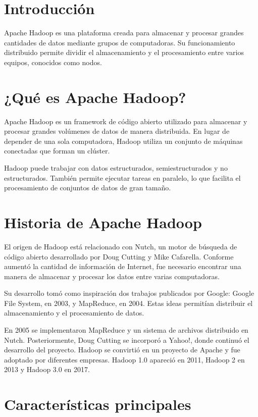 
\section{Introducción}

Apache Hadoop es una plataforma creada para almacenar y procesar grandes
cantidades de datos mediante grupos de computadoras. Su funcionamiento
distribuido permite dividir el almacenamiento y el procesamiento entre varios
equipos, conocidos como nodos.

\section{¿Qué es Apache Hadoop?}

Apache Hadoop es un framework de código abierto utilizado para almacenar y
procesar grandes volúmenes de datos de manera distribuida. En lugar de depender
de una sola computadora, Hadoop utiliza un conjunto de máquinas conectadas que
forman un clúster.

Hadoop puede trabajar con datos estructurados, semiestructurados y no
estructurados. También permite ejecutar tareas en paralelo, lo que facilita
el procesamiento de conjuntos de datos de gran tamaño.

\section{Historia de Apache Hadoop}

El origen de Hadoop está relacionado con Nutch, un motor de búsqueda de código
abierto desarrollado por Doug Cutting y Mike Cafarella. Conforme aumentó la
cantidad de información de Internet, fue necesario encontrar una manera de
almacenar y procesar los datos entre varias computadoras.

Su desarrollo tomó como inspiración dos trabajos publicados por Google: Google
File System, en 2003, y MapReduce, en 2004. Estas ideas permitían distribuir
el almacenamiento y el procesamiento de datos.

En 2005 se implementaron MapReduce y un sistema de archivos distribuido en
Nutch. Posteriormente, Doug Cutting se incorporó a Yahoo!, donde continuó el
desarrollo del proyecto. Hadoop se convirtió en un proyecto de Apache y fue
adoptado por diferentes empresas. Hadoop 1.0 apareció en 2011, Hadoop 2 en
2013 y Hadoop 3.0 en 2017.

\section{Características principales}

